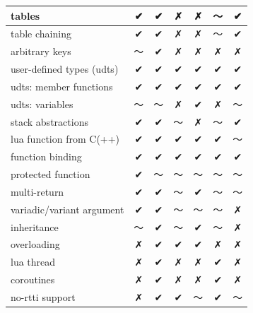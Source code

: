 \documentclass[conference,compsoc]{IEEEtran}
\begin{document}
\begin{table}[ht!]
\begin{tabular}{l c c c c c c }
		\\ \hline
		tables                    &        ✔       &     ✔    &     ✗    &     ✗     &        〜        &    ✔
		\\ \hline
		table chaining            &        ✔       &     ✔    &     ✗    &     ✗     &        〜        &    ✔
		\\ \hline
		arbitrary keys            &        〜       &     ✔    &     ✗    &     ✗     &        ✗        &    ✗
		\\ \hline
		user-defined types (udts) &        ✔       &     ✔    &     ✔    &     ✔     &        ✔        &    ✔
		\\ \hline
		udts: member functions    &        ✔       &     ✔    &     ✔    &     ✔     &        ✔        &    ✔
		\\ \hline
		udts: variables           &        〜       &     〜    &     ✗    &     ✔     &        ✗        &    〜
		\\ \hline
		stack abstractions        &        ✔       &     ✔    &     〜    &     ✗     &        〜        &    ✔
		\\ \hline
		lua function from C(++)   &        ✔       &     ✔    &     ✔    &     ✔     &        ✔        &    〜
		\\ \hline
		function binding          &        ✔       &     ✔    &     ✔    &     ✔     &        ✔        &    ✔
		\\ \hline
		protected function        &        ✔       &     〜    &     〜    &     〜     &        〜        &    〜
		\\ \hline
		multi-return              &        ✔       &     ✔    &     〜    &     ✔     &        〜        &    〜
		\\ \hline
		variadic/variant argument &        ✔       &     ✔    &     〜    &     〜     &        〜        &    ✗
		\\ \hline
		inheritance               &        〜       &     ✔    &     〜    &     ✔     &        〜        &    ✗
		\\ \hline
		overloading               &        ✗       &     ✔    &     ✔    &     ✔     &        ✗        &    ✗
		\\ \hline
		lua thread                &        ✗       &     ✔    &     ✗    &     ✗     &        ✔        &    ✗
		\\ \hline
		coroutines                &        ✗       &     ✔    &     ✗    &     ✗     &        ✔        &    ✗
		\\ \hline
		no-rtti support           &        ✗       &     ✔    &     ✔    &     〜     &        ✔        &    〜

\end{tabular}
\end{table}
\end{document}
